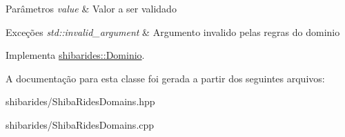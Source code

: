 \begin{DoxyParams}{Parâmetros}
{\em value} & Valor a ser validado \\
\hline
\end{DoxyParams}

\begin{DoxyExceptions}{Exceções}
{\em std\+::invalid\+\_\+argument} & Argumento invalido pelas regras do dominio \\
\hline
\end{DoxyExceptions}


Implementa \hyperlink{classshibarides_1_1Dominio_acc9445531455c072bbf708709aebbe55}{shibarides\+::\+Dominio}.



A documentação para esta classe foi gerada a partir dos seguintes arquivos\+:\begin{DoxyCompactItemize}
\item 
shibarides/Shiba\+Rides\+Domains.\+hpp\item 
shibarides/Shiba\+Rides\+Domains.\+cpp\end{DoxyCompactItemize}
